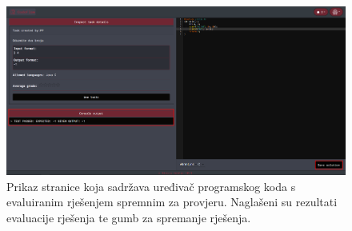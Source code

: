 \documentclass[times, utf8, zavrsni, numeric]{fer}
\begin{document}
		\begin{figure}[H]
			\centering
			\includegraphics[width=\linewidth]{pictures/koristenje/RijeseniZadatak.png}
			\caption{Prikaz stranice koja sadržava uređivač programskog koda s evaluiranim rješenjem spremnim za provjeru. Naglašeni su rezultati evaluacije rješenja te gumb za spremanje rješenja.}
			\label{fig:rjeseno}
		\end{figure}
	
\end{document}
